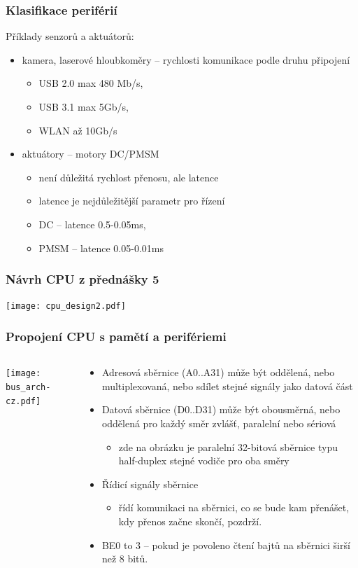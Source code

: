 \documentclass{beamer}
\begin{document}
\begin{frame}
\frametitle{Klasifikace periférií}

Příklady senzorů a aktuátorů:
\begin{itemize}
\item kamera, laserové hloubkoměry -- rychlosti komunikace podle druhu připojení
\begin{itemize}
\item USB 2.0 max 480 Mb/s, 
\item USB 3.1 max 5Gb/s, 
\item WLAN až 10Gb/s
\end{itemize}
\item aktuátory -- motory DC/PMSM 
\begin{itemize}
\item není důležitá rychlost přenosu, ale latence
\item latence je nejdůležitější parametr pro řízení
\item DC -- latence 0.5-0.05ms, 
\item PMSM -- latence 0.05-0.01ms
\end{itemize}
\end{itemize}

\end{frame}




\begin{frame}
\frametitle{Návrh CPU z přednášky 5}
\texttt{[image: cpu\_design2.pdf]}
\end{frame}

\begin{frame}
\frametitle{Propojení CPU s pamětí a perifériemi}
\begin{columns}
\begin{column}{0.4\textwidth}
\texttt{[image: bus\_arch-cz.pdf]}
\end{column}
\begin{column}{0.6\textwidth}  
\begin{itemize}
\item Adresová sběrnice (A0..A31) může být oddělená, nebo multiplexovaná, nebo sdílet stejné signály jako datová část
\item Datová sběrnice (D0..D31) může být obousměrná, nebo oddělená pro každý směr zvlášť, paralelní nebo sériová
\begin{itemize}
\item zde na obrázku je paralelní 32-bitová sběrnice typu half-duplex stejné vodiče pro oba směry
\end{itemize}
\item Řídicí signály sběrnice
\begin{itemize}
\item řídí komunikaci na sběrnici, co se bude kam přenášet, kdy přenos začne skončí, pozdrží.
\end{itemize}
\item BE0 to 3 -- pokud je povoleno čtení bajtů na sběrnici širší než 8 bitů.
\end{itemize}
\end{column}
\end{columns}
\end{frame}
\end{document}
